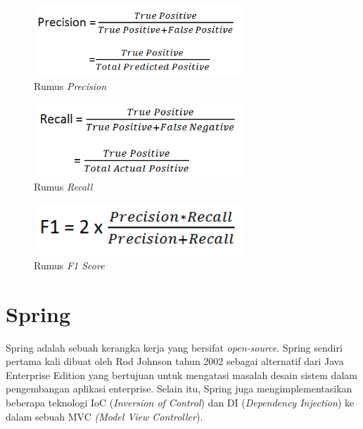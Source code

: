 \begin{figure}[!ht]
	\centering\includegraphics[width=0.7\textwidth]{bab2/figures/precision.png}
	\caption{Rumus\textit{ Precision}\cite{precisionrecall}}
	\label{fig:conf}
\end{figure}

\begin{figure}[!ht]
	\centering\includegraphics[width=0.7\textwidth]{bab2/figures/recall.png}
	\caption{Rumus\textit{ Recall}\cite{precisionrecall}}
	\label{fig:conf}
\end{figure}

\begin{figure}[!ht]
	\centering\includegraphics[width=0.7\textwidth]{bab2/figures/f1.png}
	\caption{Rumus \textit{F1 Score}\cite{precisionrecall}}
	\label{fig:conf}
\end{figure}

\section{Spring}
\par Spring adalah sebuah kerangka kerja yang bersifat \textit{open-source}. Spring sendiri pertama kali dibuat oleh Rod Johnson tahun 2002 sebagai alternatif dari Java Enterprise Edition yang bertujuan untuk mengatasi masalah desain sistem dalam pengembangan aplikasi enterprise. Selain itu, Spring juga mengimplementasikan beberapa teknologi IoC (\textit{Inversion of Control}) dan DI (\textit{Dependency Injection}) ke dalam sebuah MVC \textit{(Model View Controller})\cite{spring_def}. 